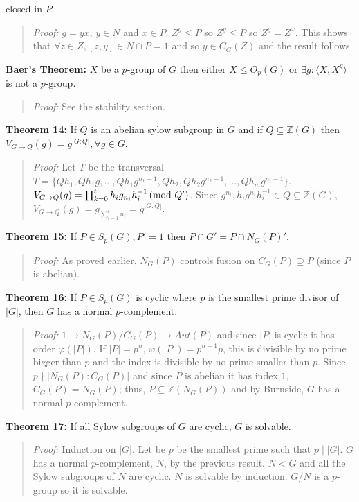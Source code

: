 closed in $P$.
\begin{quote}
\emph{Proof:} 
$g=yx$, $y \in N$ and $x \in P$.
$Z^g \leq P$ so $Z^y \leq P$ so $Z^g = Z^x$.
This shows that $\forall z \in Z, [z,y] \in N \cap P = 1$ and so
$y \in C_G(Z)$ and the result follows.
\end{quote}
{\bf Baer's Theorem:}
$X$ be a $p$-group of $G$ then either
$X \le O_p(G)$ or $\exists g: \langle X, X^g \rangle $ is not a $p$-group.
\begin{quote}
\emph{Proof:}  
See the stability section.
\end{quote}
{\bf Theorem 14:} If $Q$ is an abelian sylow subgroup in $G$ and if $Q \subseteq {\mathbb Z}(G)$ then
$V_{G \rightarrow Q}(g)= g^{|G:Q|}, \forall g \in G$.  
\begin{quote}
\emph{Proof:}  
Let $T$ be the transversal 
$T= \{ Qh_1, Qh_1g, \ldots , Qh_1g^{n_1-1}, Qh_2, Qh_2 g^{n_2-1}, \ldots, Qh_m g^{n_t-1} \}$. 
$V_{G \rightarrow Q}(g)= \prod_{k=0}^t h_i g_{n_i} h_i^{-1} \thinspace \textnormal{(mod } Q' \textnormal{)}$.  Since 
$g^{n_i}, h_i g^{n_i} h_i^{-1} \in Q \subseteq {\mathbb Z}(G)$, 
$V_{G \rightarrow Q}(g)= g_{\sum_{i=1}^t n_i} = g^{|G:Q|}$. 
\end{quote}
{\bf Theorem 15:}
If $P \in S_p (G), P'=1$ then $P \cap G' = P \cap N_G(P)'$.
\begin{quote}
\emph{Proof:}  
As proved earlier, $N_G(P)$ controls fusion on $C_G(P) \supseteq P$ (since $P$ is abelian).
\end{quote}
{\bf Theorem 16:} If $P \in S_p(G)$ is cyclic where $p$ is the smallest prime divisor of $|G|$,
then $G$ has a normal $p$-complement.
\begin{quote}
\emph{Proof:}  
$1 \rightarrow N_G(P)/C_G(P) \rightarrow Aut(P)$ and since $|P|$ is cyclic it has order
$\varphi(|P|)$.  If $|P|= p^n$, $\varphi(|P|)= p^{n-1}p$, this is divisible by no prime
bigger than $p$ and the index is divisible by no prime smaller than $p$.  
Since $p \nmid |N_G(P):C_G(P)|$ and since $P$ is abelian it has index $1$, $C_G(P)= N_G(P)$;
thus, $P \subseteq  {\mathbb Z}(N_G(P))$ and by Burnside, $G$ has a normal $p$-complement.
\end{quote}
{\bf Theorem 17:}
If all Sylow subgroups of $G$ are cyclic, $G$ is solvable.  
\begin{quote}
\emph{Proof:}  
Induction on $|G|$.  Let be $p$ be the smallest prime such that $p \mid |G|$.
$G$ has a normal $p$-complement, $N$, by the previous result.  $N < G$ and all the
Sylow subgroups of $N$ are cyclic.  $N$ is solvable by induction. $G/N$ is a $p$-group
so it is solvable.
\end{quote}
